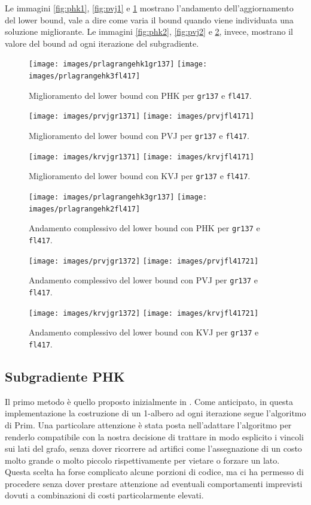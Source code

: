 Le immagini \ref{fig:phk1}, \ref{fig:pvj1} e \ref{fig:kvj1} mostrano l'andamento dell'aggiornamento del lower bound, vale a dire come varia il bound quando viene individuata una soluzione migliorante. Le immagini \ref{fig:phk2}, \ref{fig:pvj2} e \ref{fig:kvj2}, invece, mostrano il valore del bound ad ogni iterazione del subgradiente.

\begin{figure}
  \begin{center}
    \texttt{[image: images/prlagrangehk1gr137]}
    \texttt{[image: images/prlagrangehk3fl417]}
    \caption{Miglioramento del lower bound con PHK per \texttt{gr137} e \texttt{fl417}.}
    \label{fig:phk1}
      
    \texttt{[image: images/prvjgr1371]}
    \texttt{[image: images/prvjfl4171]}
    \caption{Miglioramento del lower bound con PVJ per \texttt{gr137} e \texttt{fl417}.}
    \label{fig:pvj1}

    \texttt{[image: images/krvjgr1371]}
    \texttt{[image: images/krvjfl4171]}
    \caption{Miglioramento del lower bound con KVJ per \texttt{gr137} e \texttt{fl417}.}
    \label{fig:kvj1}
  \end{center}
\end{figure}

\begin{figure}
  \begin{center}
    \texttt{[image: images/prlagrangehk3gr137]}
    \texttt{[image: images/prlagrangehk2fl417]}
    \caption{Andamento complessivo del lower bound con PHK per \texttt{gr137} e \texttt{fl417}.}
    \label{fig:phk2}
      
    \texttt{[image: images/prvjgr1372]}
    \texttt{[image: images/prvjfl41721]}
    \caption{Andamento complessivo del lower bound con PVJ per \texttt{gr137} e \texttt{fl417}.}
    \label{fig:pvj2}

    \texttt{[image: images/krvjgr1372]}
    \texttt{[image: images/krvjfl41721]}
    \caption{Andamento complessivo del lower bound con KVJ per \texttt{gr137} e \texttt{fl417}.}
    \label{fig:kvj2}
  \end{center}
\end{figure}

\subsection{Subgradiente PHK}
Il primo metodo è quello proposto inizialmente in \citep{held1970traveling}. Come anticipato, in questa implementazione la costruzione di un 1-albero ad ogni iterazione segue l'algoritmo di Prim. Una particolare attenzione è stata posta nell'adattare l'algoritmo per renderlo compatibile con la nostra decisione di trattare in modo esplicito i vincoli sui lati del grafo, senza dover ricorrere ad artifici come l'assegnazione di un costo molto grande o molto piccolo rispettivamente per vietare o forzare un lato. Questa scelta ha forse complicato alcune porzioni di codice, ma ci ha permesso di procedere senza dover prestare attenzione ad eventuali comportamenti imprevisti dovuti a combinazioni di costi particolarmente elevati. 

